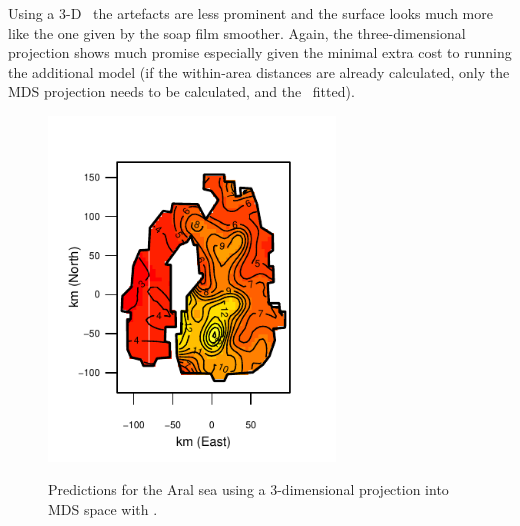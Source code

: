 {Using a 3-D \tprs\ the artefacts are less prominent and the surface looks much more like the one given by the soap film smoother. Again, the three-dimensional projection shows much promise especially given the minimal extra cost to running the additional model (if the within-area distances are already calculated, only the MDS projection needs to be calculated, and the \tprs\ fitted).

\begin{figure}
\centering
\includegraphics[width=3in]{mds/figs/aral-3d.pdf} \\
\caption{Predictions for the Aral sea using a 3-dimensional projection into MDS space with \mdsap.}
\label{aral-fit-3d}
\end{figure}


}
